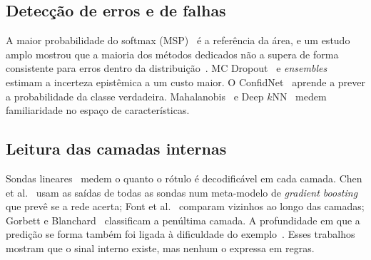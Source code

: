\subsection{Detecção de erros e de falhas}
A maior probabilidade do softmax (MSP)~\cite{hendrycks2017} é a referência da área, e um estudo amplo mostrou que a maioria dos métodos
dedicados não a supera de forma consistente para erros dentro da distribuição~\cite{jaeger2023}. MC Dropout~\cite{gal2016} e
\textit{ensembles}~\cite{lakshminarayanan2017} estimam a incerteza epistêmica a um custo maior. O ConfidNet~\cite{corbiere2019} aprende a
prever a probabilidade da classe verdadeira. Mahalanobis~\cite{lee2018} e Deep $k$NN~\cite{papernot2018} medem familiaridade no espaço
de características.

\subsection{Leitura das camadas internas}
Sondas lineares~\cite{alain2016} medem o quanto o rótulo é decodificável em cada camada. Chen et al.~\cite{chen2019} usam as saídas de todas
as sondas num meta-modelo de \textit{gradient boosting} que prevê se a rede acerta; Font et al.~\cite{font2025} comparam vizinhos ao longo
das camadas; Gorbett e Blanchard~\cite{gorbett2022} classificam a penúltima camada. A profundidade em que a predição se forma também foi
ligada à dificuldade do exemplo~\cite{baldock2021}. Esses trabalhos mostram que o sinal interno existe, mas nenhum o expressa em regras.


